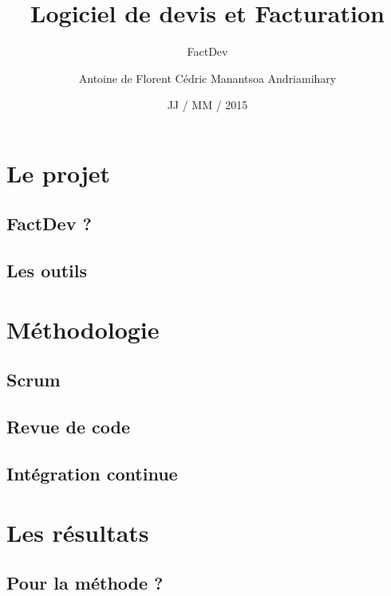 \documentclass{beamer}
\title[] %
{Logiciel de devis et Facturation}
\subtitle {FactDev}
\author[
\textbf{F}lorent\\
\textbf{A}ntoine\\
\textbf{C}édric\\
Manan\textbf{T}soa
] %
{Antoine de \bsc{Roquemaurel}\newline Florent \bsc{Berbie}\newline Cédric \bsc{Rohaut}\newline Manantsoa Andriamihary \bsc{Razanajatovo}}
\institute[] %
{
  Universit\'e Toulouse III -- Paul Sabatier \\
  M1 Informatique -- Développement Logiciel 
  \vspace{-10px}
}
\date[ ~ ~ ~ JJ / MM / 2015] %
{JJ / MM / 2015}
\begin{document}
		\begin{frame}
			\titlepage
		\end{frame}
\begin{frame}
	
\end{frame}
\section{Le projet}
\subsection{FactDev ?}
\begin{frame}
	
\end{frame}
\subsection{Les outils}
\begin{frame}
	
\end{frame}
\section{Méthodologie}
\subsection{Scrum}
\begin{frame}
	
\end{frame}
\subsection{Revue de code}
\begin{frame}
	
\end{frame}
\subsection{Intégration continue}
\begin{frame}
	
\end{frame}

\section{Les résultats}
\subsection{Pour la méthode ?}
\begin{frame}
	
\end{frame}
\end{document}
